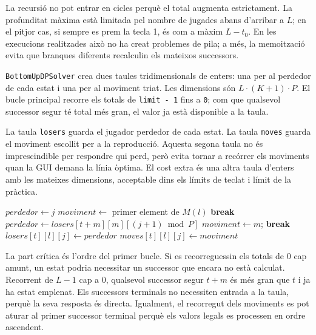 \documentclass[conference,compsoc]{IEEEtran}
\begin{document}
La recursió no pot entrar en cicles perquè el total augmenta estrictament. La
profunditat màxima està limitada pel nombre de jugades abans d'arribar a $L$; en
el pitjor cas, si sempre es prem la tecla 1, és com a màxim $L-t_0$. En les
execucions realitzades això no ha creat problemes de pila; a més, la memoització
evita que branques diferents recalculin els mateixos successors.

\texttt{BottomUpDPSolver} crea dues taules tridimensionals de enters: una per al
perdedor de cada estat i una per al moviment triat. Les dimensions són
$L \cdot (K + 1) \cdot P$. El bucle principal recorre els
totals de \texttt{limit - 1} fins a \texttt{0}; com que qualsevol successor segur
té total més gran, el valor ja està disponible a la taula.

La taula \texttt{losers} guarda el jugador perdedor de cada estat. La taula
\texttt{moves} guarda el moviment escollit per a la reproducció. Aquesta segona
taula no és imprescindible per respondre qui perd, però evita tornar a recórrer
els moviments quan la GUI demana la línia òptima. El cost extra és una altra
taula d'enters amb les mateixes dimensions, acceptable dins els límits de teclat
i límit de la pràctica.

\begin{algorithm}[H]
\caption{Esquema de l'algorisme bottom-up.}
\label{alg:bottomup}
\begin{algorithmic}[1]
            \STATE $perdedor \leftarrow j$
            \STATE $moviment \leftarrow$ primer element de $M(l)$
                    \STATE \textbf{break}
                \ENDIF
                    \STATE $perdedor \leftarrow losers[t+m][m][(j+1)\bmod P]$
                    \STATE $moviment \leftarrow m$; \textbf{break}
                \ENDIF
            \ENDFOR
            \STATE $losers[t][l][j] \leftarrow perdedor$
            \STATE $moves[t][l][j] \leftarrow moviment$
        \ENDFOR
    \ENDFOR
\ENDFOR
\end{algorithmic}
\end{algorithm}

La part crítica és l'ordre del primer bucle. Si es recorreguessin els totals de
0 cap amunt, un estat podria necessitar un successor que encara no està calculat.
Recorrent de $L-1$ cap a 0, qualsevol successor segur $t+m$ és més gran que $t$ i
ja ha estat emplenat. Els successors terminals no necessiten entrada a la taula,
perquè la seva resposta és directa. Igualment, el recorregut dels moviments es pot
aturar al primer successor terminal perquè els valors legals es processen en ordre
ascendent.
\end{document}
